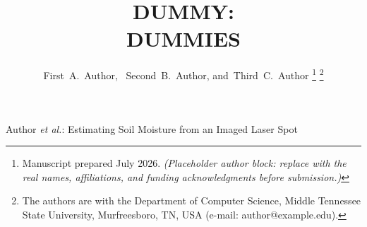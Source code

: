 ﻿\documentclass[journal]{IEEEtran}
\begin{document}
\title{DUMMY: \\
DUMMIES}

\author{First~A.~Author,~
        Second~B.~Author,
        and~Third~C.~Author%
\thanks{Manuscript prepared July 2026. \emph{(Placeholder author block: replace with the real names, affiliations, and funding acknowledgments before submission.)}}
\thanks{The authors are with the Department of Computer Science, Middle Tennessee State University, Murfreesboro, TN, USA (e-mail: author@example.edu).}}

%
{Author \MakeLowercase{\textit{et al.}}: Estimating Soil Moisture from an Imaged Laser Spot}

\maketitle
\end{document}
